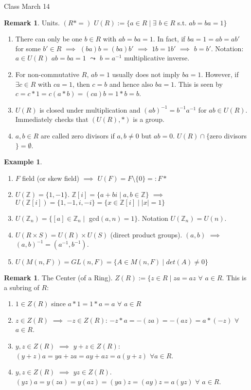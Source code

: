 \documentclass[11pt]{article}
\theoremstyle{definition}
\newtheorem{example}[thm]{Example}
\newtheorem{remark}[thm]{Remark}
\numberwithin{equation}{section}
\newcommand{\Z}{\mathbb{Z}}
\begin{document}
\begin{center}
{\sf\LARGE Class March 14}
\end{center}

\begin{remark}
Units. $(R*=)$ $U(R) := \{a \in R \mid \exists$ $b \in R$ s.t. $ab = ba = 1 \}$

\begin{enumerate}
    \item There can only be one $b \in R$ with $ab = ba = 1$. In fact, if $ba = 1 = ab = ab'$ for some $b' \in R$ $\implies$ $(ba)b = (ba)b'$ $\implies$ $1b = 1b'$ $\implies$ $b = b'$. Notation: $a \in U(R)$ $ab = ba = 1$ $\leadsto$ $b = a^{-1}$ multiplicative inverse.
    \item For non-commutative $R$, $ab = 1$ usually does not imply $ba = 1$. However, if $\exists c \in R$ with $ca = 1$, then $c = b$ and hence also $ba = 1$. This is seen by $c = c*1 = c(a*b) = (ca)b = 1*b = b$.
    \item $U(R)$ is closed under multiplication and $(ab)^{-1}=b^{-1}a^{-1}$ for $ab \in U(R)$. Immediately checks that $(U(R),*)$ is a group.
    \item $a, b \in R$ are called zero divisors if $a, b \neq 0$ but $ab = 0$. $U(R) \cap \{$zero divisors$\} = \emptyset$.
\end{enumerate}
\end{remark}

\begin{example}
\begin{enumerate}
    \item $F$ field (or skew field) $\implies$ $U(F) = F \setminus \{0\} =: F*$
    \item $U(\Z) = \{1, -1\}$. $\Z[i] = \{a+bi \mid a, b \in \Z\}$ $\implies$ $U(\Z[i]) = \{1, -1, i, -i\} = \{x \in \Z[i] \mid |x|=1\}$
    \item $U(\Z_n) = \{[a] \in \Z_n \mid $ gcd$(a, n) = 1 \}$. Notation $U(\Z_n) = U(n)$.
    \item $U(R \times S) = U(R) \times U(S)$ (direct product groups). $(a, b)$ $\implies$ $(a, b)^{-1} = (a^{-1},b^{-1})$.
    \item $U(M(n, F)) = GL(n, F) = \{A \in M(n, F) \mid det(A) \neq 0\}$
\end{enumerate}
\end{example}

\begin{remark}
The Center (of a Ring). $Z(R) := \{z \in R \mid za = az$ $\forall$ $a \in R$. This is a subring of $R$:
\begin{enumerate}
    \item $1 \in Z(R)$ since $a*1 = 1*a = a$ $\forall$ $a \in R$
    \item $z \in Z(R)$ $\implies$ $-z \in Z(R)$: $-z*a = -(za) = -(az) = a*(-z)$ $\forall$ $a \in R$.
    \item $y, z \in Z(R)$ $\implies$ $y+z \in Z(R)$: $(y+z)a = ya + za = ay + az = a(y+z)$ $\forall a \in R$.
    \item $y, z \in Z(R)$ $\implies$ $yz \in Z(R)$. $(yz)a = y(za) = y(az) = (ya)z = (ay)z = a(yz)$ $\forall$ $a \in R$.
\end{enumerate}
\end{remark}
\end{document}
